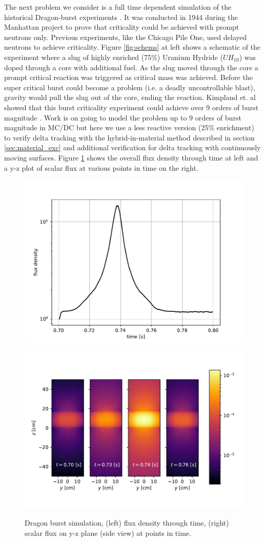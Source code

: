 The next problem we consider is a full time dependent simulation of the historical Dragon-burst experiments \cite{kimpland2021dragon}.
It was conducted in 1944 during the Manhattan project to prove that criticality could be achieved with prompt neutrons only.
Previous experiments, like the Chicago Pile One, used delayed neutrons to achieve criticality.
Figure \ref{fig:schems} at left shows a schematic of the experiment where a slug of highly enriched (75\%) Uranium Hydride ($UH_{10}$) was doped through a core with additional fuel.
As the slug moved through the core a prompt critical reaction was triggered as critical mass was achieved.
Before the super critical burst could become a problem (i.e. a deadly uncontrollable blast), gravity would pull the slug out of the core, ending the reaction.
Kimpland et. al showed that this burst criticality experiment could achieve over 9 orders of burst magnitude \cite{kimpland2021dragon}.
Work is on going to model the problem up to 9 orders of burst magnitude in MC/DC but here we use a less reactive version (25\% enrichment) to verify delta tracking with the hybrid-in-material method described in section \ref{sec:material_exc} and additional verification for delta tracking with continuously moving surfaces.
Figure \ref{fig:dragon_results} shows the overall flux density through time at left and a y-z plot of scalar flux at various points in time on the right.

\begin{figure}
    \centering
    \includegraphics[width=0.48\linewidth]{monte_carlo/delta_tracking/figures/dragon/dragon_curve.pdf}
    \includegraphics[width=0.48\linewidth]{monte_carlo/delta_tracking/figures/dragon/flux_dragon.pdf}
    \caption{Dragon burst simulation, (left) flux density through time, (right) scalar flux on y-z plane (side view) at points in time.}
    \label{fig:dragon_results}
\end{figure}

